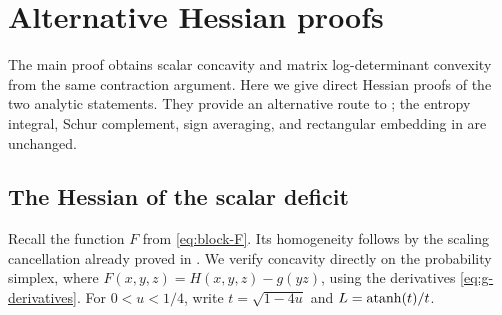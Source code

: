 \section{Alternative Hessian proofs}
\label{sec:alternative}

The main proof obtains scalar concavity and matrix log-determinant
convexity from the same contraction argument. Here we give direct
Hessian proofs of the two analytic statements. They provide an
alternative route to ; the entropy integral,
Schur complement, sign averaging, and rectangular embedding in
 are unchanged.

\subsection{The Hessian of the scalar deficit}

Recall the function $F$ from \eqref{eq:block-F}. Its homogeneity follows
by the scaling cancellation already proved in .
We verify concavity directly on the probability simplex, where
$F(x,y,z)=H(x,y,z)-g(yz)$, using the derivatives
\eqref{eq:g-derivatives}. For $0<u<1/4$, write
$t=\sqrt{1-4u}$ and $L=\operatorname{atanh}(t)/t$.

